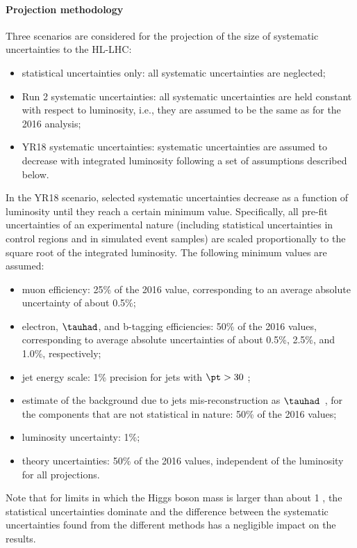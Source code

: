 \paragraph{Projection methodology}
\label{sec:method}
%
Three scenarios are considered for the projection of the size of
systematic uncertainties to the HL-LHC:
\begin{itemize}
\item
statistical uncertainties only: all systematic uncertainties are neglected;
\item
  Run 2 systematic uncertainties: all systematic uncertainties are held
  constant with respect to luminosity, i.e., they are assumed to be
  the same as for the 2016 analysis;
\item
  YR18 systematic uncertainties: systematic uncertainties are assumed to
  decrease with integrated luminosity
  following a set of assumptions described below.
\end{itemize}

In the YR18 scenario,
selected systematic uncertainties decrease
as a function of luminosity until they reach a certain minimum value. 
Specifically, all pre-fit uncertainties of an experimental nature
(including statistical uncertainties in control regions and
in simulated event samples) 
are scaled proportionally to the square root of the integrated luminosity.
The following minimum values are assumed:
\vspace{-0.2cm}
\begin{itemize}
\item
muon efficiency: 25\% of the 2016 value, corresponding to an average absolute uncertainty of about 0.5\%; 
\item
electron, $\tauhad$, and b-tagging efficiencies: 50\% of the 2016 values, 
corresponding to average absolute uncertainties
of about 0.5\%, 2.5\%, and 1.0\%, respectively;
\item
jet energy scale: 1\% precision for jets with $\pt > 30$ \UGeV; %
\item
  estimate of the background due to jets mis-reconstruction
  as $\tauhad$~\cite{HIG-15-007},
  for the components that are not statistical in nature:
  50\% of the 2016 values;
\item
luminosity uncertainty: 1\%;
\item
  theory uncertainties: 50\% of the 2016 values,
  independent of the luminosity for all projections.
\end{itemize}
Note that for limits in which the Higgs boson mass is larger than about 1 \UTeV,
the statistical uncertainties dominate and
the difference between the systematic uncertainties found from
the different methods has a negligible impact on the results.

